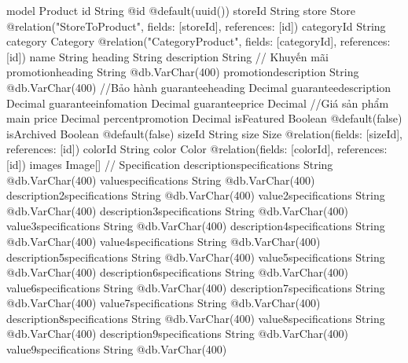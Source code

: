model Product {
  id                          String                 @id @default(uuid())
  storeId                     String
  store                       Store                  @relation("StoreToProduct", fields: [storeId], references: [id])
  categoryId                  String
  category                    Category               @relation("CategoryProduct", fields: [categoryId], references: [id])
  name                        String
  heading                     String
  description                 String
  // Khuyến mãi
  promotionheading            String                 @db.VarChar(400)
  promotiondescription        String                 @db.VarChar(400)
  //Bảo hành
  guaranteeheading            Decimal
  guaranteedescription        Decimal
  guaranteeinfomation         Decimal
  guaranteeprice              Decimal
  //Giá sản phẩm main
  price                       Decimal
  percentpromotion            Decimal
  isFeatured                  Boolean                @default(false)
  isArchived                  Boolean                @default(false)
  sizeId                      String
  size                        Size                   @relation(fields: [sizeId], references: [id])
  colorId                     String
  color                       Color                  @relation(fields: [colorId], references: [id])
  images                      Image[]
  // Specification
  descriptionspecifications   String                 @db.VarChar(400)
  valuespecifications         String                 @db.VarChar(400)
  description2specifications  String                 @db.VarChar(400)
  value2specifications        String                 @db.VarChar(400)
  description3specifications  String                 @db.VarChar(400)
  value3specifications        String                 @db.VarChar(400)
  description4specifications  String                 @db.VarChar(400)
  value4specifications        String                 @db.VarChar(400)
  description5specifications  String                 @db.VarChar(400)
  value5specifications        String                 @db.VarChar(400)
  description6specifications  String                 @db.VarChar(400)
  value6specifications        String                 @db.VarChar(400)
  description7specifications  String                 @db.VarChar(400)
  value7specifications        String                 @db.VarChar(400)
  description8specifications  String                 @db.VarChar(400)
  value8specifications        String                 @db.VarChar(400)
  description9specifications  String                 @db.VarChar(400)
  value9specifications        String                 @db.VarChar(400)
}
